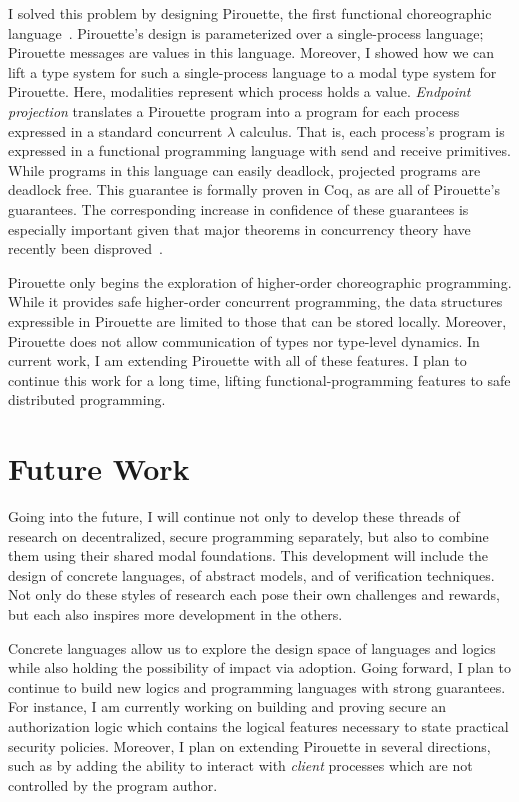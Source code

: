 \documentclass{article}
\theoremstyle{definition}
\begin{document}
I solved this problem by designing Pirouette, the first functional choreographic language~\citep{HirschG22}.
Pirouette's design is parameterized over a single-process language; Pirouette messages are values in this language.
Moreover, I showed how we can lift a type system for such a single-process language to a modal type system for Pirouette.
Here, modalities represent which process holds a value.
\emph{Endpoint projection} translates a Pirouette program into a program for each process expressed in a standard concurrent $\lambda$ calculus.
That is, each process's program is expressed in a functional programming language with \textsf{send} and \textsf{receive} primitives.
While programs in this language can easily deadlock, projected programs are deadlock free.
This guarantee is formally proven in Coq, as are all of Pirouette's guarantees.
The corresponding increase in confidence of these guarantees is especially important given that major theorems in concurrency theory have recently been disproved~\citep{Cruz-FilipeMP19}.

Pirouette only begins the exploration of higher-order choreographic programming.
While it provides safe higher-order concurrent programming, the data structures expressible in Pirouette are limited to those that can be stored locally.
Moreover, Pirouette does not allow communication of types nor type-level dynamics.
In current work, I am extending Pirouette with all of these features.
I plan to continue this work for a long time, lifting functional-programming features to safe distributed programming.

\section*{Future Work}

Going into the future, I will continue not only to develop these threads of research on decentralized, secure programming separately, but also to combine them using their shared modal foundations.
This development will include the design of concrete languages, of abstract models, and of verification techniques.
Not only do these styles of research each pose their own challenges and rewards, but each also inspires more development in the others.

Concrete languages allow us to explore the design space of languages and logics while also holding the possibility of impact via adoption.
Going forward, I plan to continue to build new logics and programming languages with strong guarantees.
For instance, I am currently working on building and proving secure an authorization logic which contains the logical features necessary to state practical security policies.
Moreover, I plan on extending Pirouette in several directions, such as by adding the ability to interact with \emph{client} processes which are not controlled by the program author.
\end{document}
